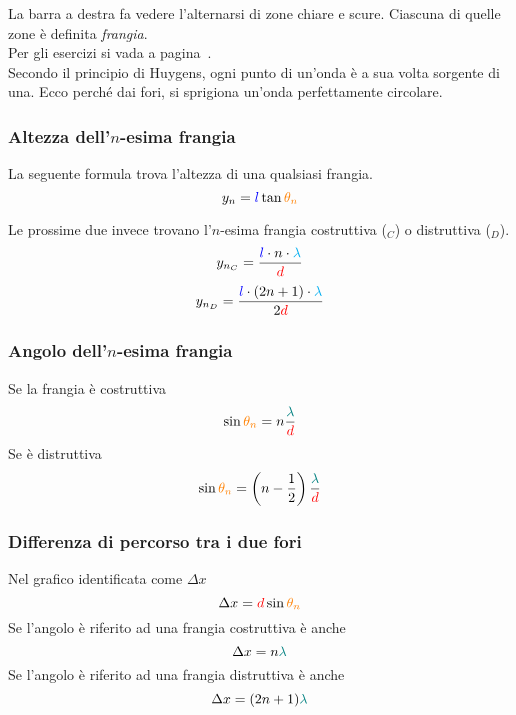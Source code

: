 La barra a destra fa vedere l'alternarsi di zone chiare e scure. Ciascuna di quelle zone è definita
\emph{frangia}.\\
Per gli esercizi si vada a pagina~\pageref{ex:young}.\\ [\baselineskip]
Secondo il principio di Huygens, ogni punto di un'onda è a sua volta sorgente di una. Ecco perché
dai fori, si sprigiona un'onda perfettamente circolare.

\subsubsection{Altezza dell'$n$-esima frangia}
La seguente formula trova l'altezza di una qualsiasi frangia.
\begin{equation*}
y_n = \mathcolor{blue}{l}\tan\mathcolor{orange}{\theta_n}
\end{equation*}

Le prossime due invece trovano l'$n$-esima frangia costruttiva ($_C$) o distruttiva ($_D$).
\begin{equation*}
y_{n_C} = \frac{\mathcolor{blue}{l}\cdot n\cdot\mathcolor{cyan}{\lambda}}{\mathcolor{red}{d}}
\end{equation*}
\begin{equation*}
y_{n_D} = \frac{\mathcolor{blue}{l}\cdot (2n+1)\cdot\mathcolor{cyan}{\lambda}}{2\mathcolor{red}{d}}
\end{equation*}

\subsubsection{Angolo dell'$n$-esima frangia}
Se la frangia è costruttiva
\begin{equation*}
\sin\mathcolor{orange}{\theta_n} = n\frac{\mathcolor{teal}{\lambda}}{\mathcolor{red}{d}}
\end{equation*}
Se è distruttiva
\begin{equation*}
\sin\mathcolor{orange}{\theta_n} =
\left(n-\frac{1}{2}\right)\frac{\mathcolor{teal}{\lambda}}{\mathcolor{red}{d}}
\end{equation*}

\subsubsection{Differenza di percorso tra i due fori}
Nel grafico identificata come $\Delta x$
\begin{equation*}
\Delta x = \mathcolor{red}{d}\sin\mathcolor{orange}{\theta_n}
\end{equation*}
Se l'angolo è riferito ad una frangia costruttiva è anche
\begin{equation*}
\Delta x = n\mathcolor{teal}{\lambda}
\end{equation*}
Se l'angolo è riferito ad una frangia distruttiva è anche
\begin{equation*}
\Delta x = (2n+1)\mathcolor{teal}{\lambda}
\end{equation*}

